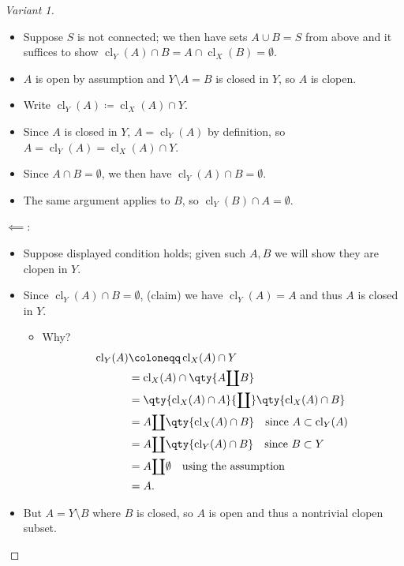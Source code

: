 \begin{solution}
\begin{proof}[Variant 1]
\begin{itemize}
\tightlist
\item
  Suppose \(S\) is not connected; we then have sets \(A \cup B = S\)
  from above and it suffices to show
  \(\operatorname{cl}_Y(A) \cap B = A \cap\operatorname{cl}_X(B) = \emptyset\).
\item
  \(A\) is open by assumption and \(Y\setminus A = B\) is closed in
  \(Y\), so \(A\) is clopen.
\item
  Write
  \(\operatorname{cl}_Y(A) \coloneqq\operatorname{cl}_X(A) \cap Y\).
\item
  Since \(A\) is closed in \(Y\), \(A = \operatorname{cl}_Y(A)\) by
  definition, so
  \(A = \operatorname{cl}_Y(A) = \operatorname{cl}_X(A) \cap Y\).
\item
  Since \(A\cap B = \emptyset\), we then have
  \(\operatorname{cl}_Y(A) \cap B = \emptyset\).
\item
  The same argument applies to \(B\), so
  \(\operatorname{cl}_Y(B) \cap A = \emptyset\).
\end{itemize}

\(\impliedby\):

\begin{itemize}
\tightlist
\item
  Suppose displayed condition holds; given such \(A, B\) we will show
  they are clopen in \(Y\).
\item
  Since \(\operatorname{cl}_Y(A) \cap B = \emptyset\), (claim) we have
  \(\operatorname{cl}_Y(A) = A\) and thus \(A\) is closed in \(Y\).

  \begin{itemize}
  \tightlist
  \item
    Why?
    \begin{align*}     \operatorname{cl}_Y(A) &\coloneqq\operatorname{cl}_X(A) \cap Y \\      &= \operatorname{cl}_X(A) \cap\qty{A{\coprod}B} \\      &= \qty{\operatorname{cl}_X(A) \cap A} {\coprod}\qty{\operatorname{cl}_X(A) \cap B} \\     &= A  {\coprod}\qty{\operatorname{cl}_X(A) \cap B}      \quad\text{since } A \subset \operatorname{cl}_Y(A) \\     &= A {\coprod}\qty{\operatorname{cl}_Y(A) \cap B}      \quad \text{since } B \subset Y \\     &= A {\coprod}\emptyset \quad\text{using the assumption} \\     &= A     .\end{align*}
  \end{itemize}
\item
  But \(A = Y\setminus B\) where \(B\) is closed, so \(A\) is open and
  thus a nontrivial clopen subset.
\end{itemize}


\end{proof}
\end{solution}
